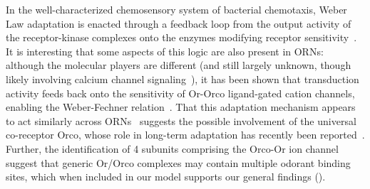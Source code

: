 \documentclass[9pt,lineno]{elife}
\begin{document}
In the well-characterized chemosensory system of bacterial chemotaxis, Weber Law adaptation is enacted through a feedback loop from the output activity of the receptor-kinase complexes onto the enzymes modifying receptor sensitivity~\citep{EmonetReview}. It is interesting that some aspects of this logic are also present in ORNs: although the molecular players are different (and still largely unknown, though likely involving calcium channel signaling~\citep{cao_WL}), it has been shown that transduction activity feeds back onto the sensitivity of Or-Orco ligand-gated cation channels, enabling the Weber-Fechner relation~\citep{nagel_wilson_biophysical,srinivas_elife,cao_WL}. 
That this adaptation mechanism appears to act similarly across ORNs~\citep{srinivas_elife,martelli,cao_WL} suggests the possible involvement of the universal co-receptor Orco, whose role in long-term adaptation has recently been reported~\citep{getahun2013insect,getahun2016intracellular,Guo_Smith}. Further, the identification of 4 subunits comprising the Orco-Or ion channel suggest that generic Or/Orco complexes may contain multiple odorant binding sites, which when included in our model supports our general findings ().
\end{document}
